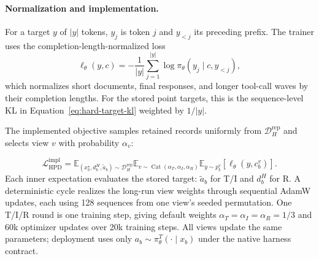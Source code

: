 \documentclass{article}
\begin{document}
\paragraph{Normalization and implementation.}
For a target $y$ of $|y|$ tokens, $y_j$ is token $j$ and $y_{<j}$ its
preceding prefix. The trainer uses the completion-length-normalized loss
\begin{equation}
\ell_\theta(y,c)=
-\frac{1}{|y|}\sum_{j=1}^{|y|}
\log\pi_\theta(y_j\mid c,y_{<j}),
\label{eq:length-normalized-nll}
\end{equation}
which normalizes short documents, final responses, and longer tool-call waves
by their completion lengths. For the stored point targets, this is the
sequence-level KL in Equation~\ref{eq:hard-target-kl} weighted by $1/|y|$.

The implemented objective samples retained records uniformly from
$\mathcal D_H^{\mathrm{rep}}$ and selects view $v$ with probability $\alpha_v$:

\begin{equation}
\mathcal L_{\mathrm{HPD}}^{\mathrm{impl}}
=\mathbb E_{(x_b^\star,d_b^H,\tilde a_b)
\sim\mathcal D_H^{\mathrm{rep}}}
\mathbb E_{v\sim\operatorname{Cat}(\alpha_T,\alpha_I,\alpha_R)}
\mathbb E_{y\sim p_b^v}
\left[\ell_\theta(y,c_b^v)\right].
\label{eq:implemented-objective}
\end{equation}
Each inner expectation evaluates the stored target: $\tilde a_b$ for T/I
and $d_b^H$ for R. A deterministic cycle realizes the long-run view weights
through sequential AdamW updates, each using 128 sequences from one view's
seeded permutation. One T/I/R round is one training step, giving default
weights $\alpha_T=\alpha_I=\alpha_R=1/3$ and 60k optimizer updates over 20k
training steps. All views update the same parameters; deployment uses only
$a_b\sim\pi_\theta^T(\cdot\mid x_b)$ under the native harness contract.
\end{document}
